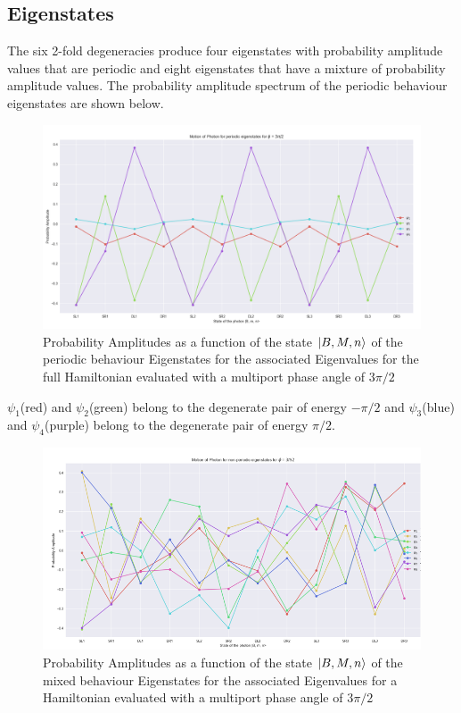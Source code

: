\subsection{Eigenstates}
The six 2-fold degeneracies produce four eigenstates with probability amplitude values that are periodic and eight eigenstates that have a mixture of probability amplitude values. The probability amplitude spectrum of the periodic behaviour eigenstates are shown below. 
\begin{figure}[H]
    \centering
    \includegraphics[scale=0.4]{2_Body/Figures/eigenstate_full.png}
    \caption{Probability Amplitudes as a function of the state $\ket{B,M,n}$ of the periodic behaviour Eigenstates for the associated Eigenvalues for the full Hamiltonian evaluated with a multiport phase angle of $3\pi/2$}
    \label{fig:my_label}
\end{figure} 
$\psi_{1}$(red) and $\psi_{2}$(green) belong to the degenerate pair of energy $-\pi/2$ and $\psi_{3}$(blue) and $\psi_{4}$(purple) belong to the degenerate pair of energy $\pi/2$. 

\begin{figure}[H]
    \centering
    \includegraphics[scale=0.75]{2_Body/Figures/non_periodic_full.png}
    \caption{Probability Amplitudes as a function of the state $\ket{B,M,n}$ of the mixed behaviour Eigenstates for the associated Eigenvalues for a Hamiltonian evaluated with a multiport phase angle of $3\pi/2$}
    \label{fig:my_label}
\end{figure}


